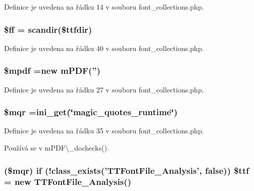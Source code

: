 Definice je uvedena na řádku 14 v souboru font\-\_\-collections.\-php.

\hypertarget{font__collections_8php_a064fd64c462dd929cd17812cf14ec09e}{
\subsubsection[{\$ff}]{\setlength{\rightskip}{0pt plus 5cm}\$ff = scandir(\$ttfdir)}}\label{font__collections_8php_a064fd64c462dd929cd17812cf14ec09e}


Definice je uvedena na řádku 40 v souboru font\-\_\-collections.\-php.

\hypertarget{font__collections_8php_ad028f81910d6cbab9b184d2214b3a8f8}{
\subsubsection[{\$mpdf}]{\setlength{\rightskip}{0pt plus 5cm}\$mpdf =new {\bf m\-P\-D\-F}('')}}\label{font__collections_8php_ad028f81910d6cbab9b184d2214b3a8f8}


Definice je uvedena na řádku 27 v souboru font\-\_\-collections.\-php.

\hypertarget{font__collections_8php_ad04a9e91774b9f9d3044e0c2b7636ca1}{
\subsubsection[{\$mqr}]{\setlength{\rightskip}{0pt plus 5cm}\$mqr =ini\-\_\-get(\char`\"{}magic\-\_\-quotes\-\_\-runtime\char`\"{})}}\label{font__collections_8php_ad04a9e91774b9f9d3044e0c2b7636ca1}


Definice je uvedena na řádku 35 v souboru font\-\_\-collections.\-php.



Používá se v m\-P\-D\-F\textbackslash{}\-\_\-dochecks().

\hypertarget{font__collections_8php_afff581834e571b043984b18c7bfbe4e6}{
\subsubsection[{\$ttf}]{ (\$mqr) {\bf if} (!class\-\_\-exists('T\-T\-Font\-File\-\_\-\-Analysis', {\bf false})) \$ttf = new T\-T\-Font\-File\-\_\-\-Analysis()}}\label{font__collections_8php_afff581834e571b043984b18c7bfbe4e6}



